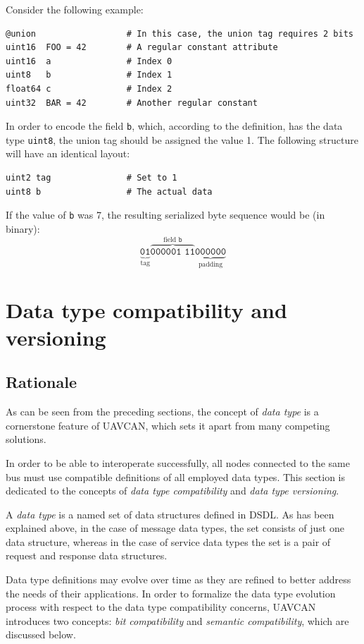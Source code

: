 Consider the following example:

\begin{verbatim}
@union                  # In this case, the union tag requires 2 bits
uint16  FOO = 42        # A regular constant attribute
uint16  a               # Index 0
uint8   b               # Index 1
float64 c               # Index 2
uint32  BAR = 42        # Another regular constant
\end{verbatim}

In order to encode the field \verb|b|, which, according to the definition,
has the data type \verb|uint8|, the union tag should be assigned the value 1.
The following structure will have an identical layout:

\begin{verbatim}
uint2 tag               # Set to 1
uint8 b                 # The actual data
\end{verbatim}

If the value of \verb|b| was 7, the resulting serialized byte sequence would be (in binary):
$$%
\underbrace{\texttt{01}}_{\text{tag}}%
\overbrace{\texttt{000001 11}}^{\text{field }\texttt{b}}%
\underbrace{\texttt{000000}}_{\text{padding}}%
$$

\section{Data type compatibility and versioning}\label{sec:dsdl_versioning}

\subsection{Rationale}

As can be seen from the preceding sections,
the concept of \emph{data type} is a cornerstone feature of UAVCAN,
which sets it apart from many competing solutions.

In order to be able to interoperate successfully,
all nodes connected to the same bus must use compatible definitions of all employed data types.
This section is dedicated to the concepts of \emph{data type compatibility}
and \emph{data type versioning}.

A \emph{data type} is a named set of data structures defined in DSDL.
As has been explained above, in the case of message data types,
the set consists of just one data structure, whereas in the case of service data types
the set is a pair of request and response data structures.

Data type definitions may evolve over time as they are refined to better address the needs of their applications.
In order to formalize the data type evolution process with respect to the data type compatibility concerns,
UAVCAN introduces two concepts: \emph{bit compatibility} and \emph{semantic compatibility},
which are discussed below.

